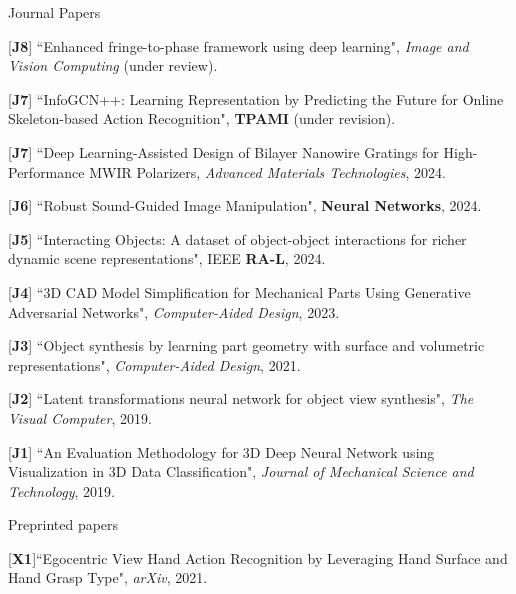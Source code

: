 \begin{cventries}
\vspace{-.5em}
\cvpub
{Journal Papers} %
{ %
\begin{cvitems}
    \item {[\textbf{J8}] ``Enhanced fringe-to-phase framework using deep learning", \textit{Image and Vision Computing} (under review).}
    \item {[\textbf{J7}] ``InfoGCN++: Learning Representation by Predicting the Future for Online Skeleton-based Action Recognition", \textbf{TPAMI} (under revision). }
    \item {[\textbf{J7}] ``Deep Learning-Assisted Design of Bilayer Nanowire Gratings for High-Performance MWIR Polarizers, \textit{Advanced Materials Technologies}, 2024. }
    \item {[\textbf{J6}] ``Robust Sound-Guided Image Manipulation", \textbf{Neural Networks}, 2024.}
    \item {[\textbf{J5}] ``Interacting Objects: A dataset of object-object interactions for richer dynamic scene representations", IEEE \textbf{RA-L}, 2024.}
    \item {[\textbf{J4}] ``3D CAD Model Simplification for Mechanical Parts Using Generative Adversarial Networks", \textit{Computer-Aided Design}, 2023.}
    \item {[\textbf{J3}] ``Object synthesis by learning part geometry with surface and volumetric representations", \textit{Computer-Aided Design}, 2021.}
    \item {[\textbf{J2}] ``Latent transformations neural network for object view synthesis", \textit{The Visual Computer}, 2019.}
    \item {[\textbf{J1}] ``An Evaluation Methodology for 3D Deep Neural Network using Visualization in 3D Data Classification", \textit{Journal of Mechanical Science and Technology}, 2019.}
\end{cvitems}
}

\vspace{-.5em}
\cvpub
{Preprinted papers} %
{
\begin{cvitems}
    \item {[\textbf{X1}]``Egocentric View Hand Action Recognition by Leveraging Hand Surface and Hand Grasp Type", \textit{arXiv}, 2021. }
\end{cvitems}
}


\end{cventries}

